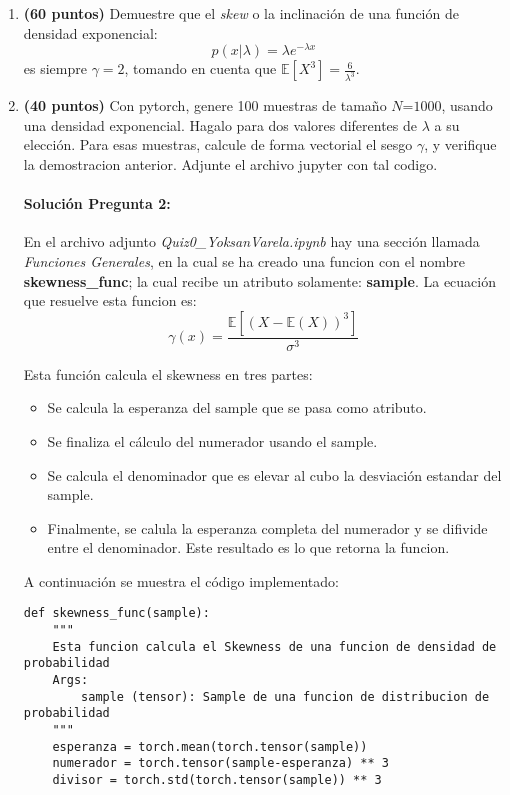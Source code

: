\documentclass[spanish]{article}
\begin{document}
\begin{enumerate}
\item \textbf{(60 puntos)} Demuestre que el \emph{skew }o la inclinaci\'{o}n
de una funci\'{o}n de densidad exponencial:
\[
p\left(x|\lambda\right)=\lambda e^{-\lambda x}
\]
es siempre $\gamma=2$, tomando en cuenta que $\mathbb{E}\left[X^{3}\right]=\frac{6}{\lambda^{3}}$.

\item \textbf{(40 puntos)} Con pytorch, genere 100 muestras de tama\~{n}o
$N\text{=1000}$, usando una densidad exponencial. Hagalo para dos
valores diferentes de $\lambda$ a su elecci\'{o}n. Para esas muestras,
calcule de forma vectorial el sesgo $\gamma$, y verifique la demostracion
anterior. Adjunte el archivo jupyter con tal codigo.

\paragraph{Soluci\'{o}n Pregunta 2:}
En el archivo adjunto \emph{Quiz0\_YoksanVarela.ipynb} hay una secci\'{o}n llamada \emph{Funciones Generales}, en la cual se ha creado una funcion con el nombre \textbf{skewness\_func}; la cual recibe un atributo solamente: \textbf{sample}. La ecuaci\'{o}n que resuelve esta funcion es:\\
\begin{equation}
\gamma(x) =\frac{\mathbb{E}\left[(X-\mathbb{E}(X))^3\right]}{\sigma^{3}} 
\end{equation}

Esta funci\'{o}n calcula el skewness en tres partes:
\begin{itemize}
    \item Se calcula la esperanza del sample que se pasa como atributo.
    \item Se finaliza el c\'{a}lculo del numerador usando el sample.
    \item Se calcula el denominador que es elevar al cubo la desviaci\'{o}n estandar del sample.
    \item Finalmente, se calula la esperanza completa del numerador y se difivide entre el denominador. Este resultado es lo que retorna la funcion.
\end{itemize}
A continuaci\'{o}n se muestra el c\'{o}digo implementado:
\begin{verbatim}
def skewness_func(sample):
    """
    Esta funcion calcula el Skewness de una funcion de densidad de probabilidad
    Args:
        sample (tensor): Sample de una funcion de distribucion de probabilidad
    """
    esperanza = torch.mean(torch.tensor(sample))
    numerador = torch.tensor(sample-esperanza) ** 3
    divisor = torch.std(torch.tensor(sample)) ** 3
    

\end{verbatim}
\end{enumerate}
\end{document}
